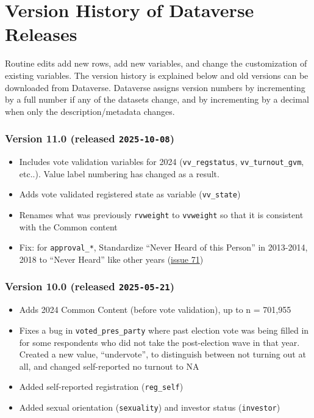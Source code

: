 \documentclass[10pt,article,oneside]{memoir}
\begin{document}
\newpage

\section{Version History of Dataverse
Releases}\label{version-history-of-dataverse-releases}

Routine edits add new rows, add new variables, and change the
customization of existing variables. The version history is explained
below and old versions can be downloaded from Dataverse. Dataverse
assigns version numbers by incrementing by a full number if any of the
datasets change, and by incrementing by a decimal when only the
description/metadata changes.

\subsubsection{\texorpdfstring{Version 11.0 (released
\texttt{2025-10-08})}{Version 11.0 (released 2025-10-08)}}\label{version-11.0-released-2025-10-08}

\begin{itemize}
\tightlist
\item
  Includes vote validation variables for 2024 (\texttt{vv\_regstatus},
  \texttt{vv\_turnout\_gvm}, etc..). Value label numbering has changed
  as a result.
\item
  Adds vote validated registered state as variable (\texttt{vv\_state})
\item
  Renames what was previously \texttt{rvweight} to \texttt{vvweight} so
  that it is consistent with the Common content
\item
  Fix: for \texttt{approval\_*}, Standardize ``Never Heard of this
  Person'' in 2013-2014, 2018 to ``Never Heard'' like other years
  (\href{https://github.com/kuriwaki/cces_cumulative/issues/71}{issue
  71})
\end{itemize}

\subsubsection{\texorpdfstring{Version 10.0 (released
\texttt{2025-05-21})}{Version 10.0 (released 2025-05-21)}}\label{version-10.0-released-2025-05-21}

\begin{itemize}
\tightlist
\item
  Adds 2024 Common Content (before vote validation), up to n = 701,955
\item
  Fixes a bug in \texttt{voted\_pres\_party} where past election vote
  was being filled in for some respondents who did not take the
  post-election wave in that year. Created a new value, ``undervote'',
  to distinguish between not turning out at all, and changed
  self-reported no turnout to NA
\item
  Added self-reported registration (\texttt{reg\_self})
\item
  Added sexual orientation (\texttt{sexuality}) and investor status
  (\texttt{investor})
\end{itemize}
\end{document}
